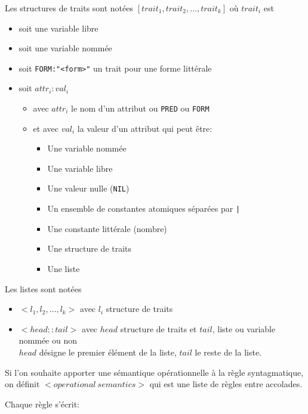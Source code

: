 \documentclass[11pt]{article}
\begin{document}
Les structures de traits sont notées $[ trait_1, trait_2, \dots , trait_k ]$ où $trait_i$ est
\begin{itemize}
\item soit une variable libre
\item soit une variable nommée
\item soit \verb#FORM:"<form>"# un trait pour une forme littérale
\item soit $attr_i:val_i$
  \begin{itemize}
  \item avec $attr_i$ le nom d'un attribut ou \texttt{PRED} ou \texttt{FORM}
  \item et avec $val_i$ la valeur d'un attribut qui peut être: 
    
    \begin{itemize}
    \item Une variable nommée
    \item Une variable libre
    \item Une valeur nulle (\texttt{NIL})
    \item Un ensemble de constantes atomiques séparées par \verb#|#
    \item Une constante littérale (nombre)
    \item Une structure de traits
    \item Une liste
    \end{itemize}
  \end{itemize}
  
\end{itemize}

Les listes sont notées
\begin{itemize}
\item $<l_1, l_2, \dots, l_k>$ avec $l_i$ structure de traits
\item $<head::tail>$ avec $head$ structure de traits et $tail$, liste ou variable nommée ou non\\
  $head$ désigne le premier élément de la liste, $tail$ le reste de la liste.\\
\end{itemize}

 Si l'on souhaite apporter une sémantique opérationnelle à la règle syntagmatique, on
définit $<operational~semantics>$ qui est une liste de règles entre accolades.

Chaque règle s'écrit:
\end{document}
